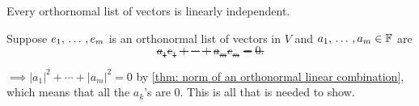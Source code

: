\begin{thm}
  \label{thm: orthonormal lists are linearly independent}
  Every orthornomal list of vectors is linearly independent.
\end{thm}
\begin{prf}
  Suppose $e_1, {\, \ldots \,\,}, e_m$ is an orthonormal list of vectors in $V$ and $a_1, {\, \ldots \,\,}, a_m \in \mathbb{F}$ are \st\begin{equation}
    a_1e_1 + \cdots + a_m e_m = 0.
  \end{equation}

  $\implies |a_1|^2 + \cdots + |a_m|^2 = 0$ by \ref{thm: norm of an orthonormal linear combination}, which means that all the $a_k$'s are $0$. This is all that is needed to show.
\end{prf}

